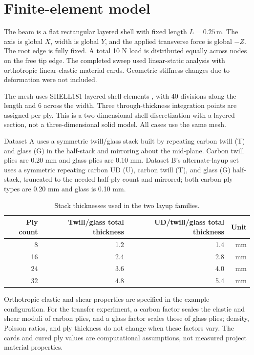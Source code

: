 \documentclass[11pt]{article}
\begin{document}
\section{Finite-element model}
The beam is a flat rectangular layered shell with fixed length $L=0.25\,\mathrm{m}$. The axis is global $X$, width is global $Y$, and the applied transverse force is global $-Z$. The root edge is fully fixed. A total 10 N load is distributed equally across nodes on the free tip edge. The completed sweep used linear-static analysis with orthotropic linear-elastic material cards. Geometric stiffness changes due to deformation were not included.

The mesh uses SHELL181 layered shell elements \cite{ansys}, with 40 divisions along the length and 6 across the width. Three through-thickness integration points are assigned per ply. This is a two-dimensional shell discretization with a layered section, not a three-dimensional solid model. All cases use the same mesh.

Dataset A uses a symmetric twill/glass stack built by repeating carbon twill (T) and glass (G) in the half-stack and mirroring about the mid-plane. Carbon twill plies are 0.20 mm and glass plies are 0.10 mm. Dataset B's alternate-layup set uses a symmetric repeating carbon UD (U), carbon twill (T), and glass (G) half-stack, truncated to the needed half-ply count and mirrored; both carbon ply types are 0.20 mm and glass is 0.10 mm.

\begin{table}[ht]
\centering
\caption{Stack thicknesses used in the two layup families.}
\begin{tabular}{rrrr}
\toprule
Ply count & Twill/glass total thickness & UD/twill/glass total thickness & Unit \\
\midrule
8  & 1.2 & 1.4 & mm \\
16 & 2.4 & 2.8 & mm \\
24 & 3.6 & 4.0 & mm \\
32 & 4.8 & 5.4 & mm \\
\bottomrule
\end{tabular}
\end{table}

Orthotropic elastic and shear properties are specified in the example configuration. For the transfer experiment, a carbon factor scales the elastic and shear moduli of carbon plies, and a glass factor scales those of glass plies; density, Poisson ratios, and ply thickness do not change when these factors vary. The cards and cured ply values are computational assumptions, not measured project material properties.
\end{document}

